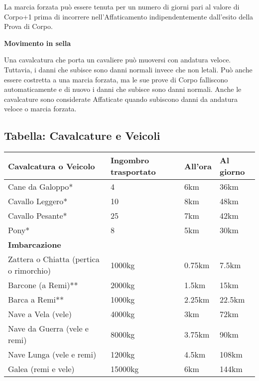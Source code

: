 \documentclass[12pt,a4paper,twoside,openany]{book}
\begin{document}
\begin{multicols}{2}
La marcia forzata può essere tenuta per un numero di giorni pari al valore di Corpo+1 prima di incorrere nell'Affaticamento indipendentemente dall'esito della Prova di Corpo.


\textbf{Movimento in sella}\label{movimentoacavallo}

Una cavalcatura che porta un cavaliere può muoversi con andatura veloce. Tuttavia, i danni che subisce sono danni normali invece che non letali. Può anche essere costretta a una marcia forzata, ma le sue prove di Corpo falliscono automaticamente e di nuovo i danni che subisce sono danni normali. Anche le cavalcature sono considerate Affaticate quando subiscono danni da andatura veloce o marcia forzata.

\end{multicols}


\subsection{Tabella: Cavalcature e Veicoli}

\medskip

\label{tabella-cavalcature-e-veicoli}

\begin{tabularx}{0.95\textwidth}{lXXX}
\textbf{Cavalcatura o Veicolo} & \textbf{Ingombro trasportato} & \textbf{All'ora} & \textbf{Al giorno}\\
\toprule
Cane da Galoppo*  & 4 & 6km & 36km  \\
Cavallo Leggero*  & 10  & 8km & 48km  \\
Cavallo Pesante* & 25  & 7km & 42km  \\
Pony* & 8& 5km & 30km  \\
\textbf{Imbarcazione} &  &  & \\
\toprule
Zattera o Chiatta (pertica o rimorchio)  & 1000kg & 0.75km & 7.5km \\
Barcone (a Remi)**  & 2000kg & 1.5km  & 15km  \\
Barca a Remi**  & 1000kg & 2.25km & 22.5km  \\
Nave a Vela (vele)  & 4000kg & 3km  & 72km  \\
Nave da Guerra (vele e remi) & 8000kg & 3.75km & 90km  \\
Nave Lunga (vele e remi)  & 1200kg  & 4.5km  & 108km \\
Galea (remi e vele) & 15000kg & 6km  & 144km \\
\end{tabularx}
\end{document}
